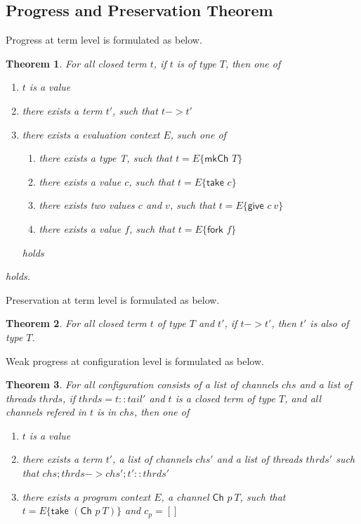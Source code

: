 \documentclass{article}
\newtheorem{theorem}{Theorem}
\newcommand{\sco}[1]{\textsf{#1}}
\newcommand{\fork}[1]{\sco{fork }#1}
\newcommand{\give}[2]{\sco{give } #1\ #2}
\newcommand{\take}[1]{\sco{take } #1}
\newcommand{\mkch}[1]{\sco{mkCh } #1}
\newcommand{\channel}[2]{\sco{Ch }#1\ #2}
\begin{document}
\subsection{Progress and Preservation Theorem}

Progress at term level is formulated as below.

\begin{theorem}
    For all closed term $t$, if $t$ is of type $T$, then one of
    \begin{enumerate}
        \item $t$ is a value
        \item there exists a term $t'$, such that $t -> t'$
        \item there exists a evaluation context $E$, such one of
                \begin{enumerate}
                    \item there exists a type T, such that $t = E\{\mkch{T}\}$
                    \item there exists a value $c$, such that $t = E\{\take{c}\}$
                    \item there exists two values $c$ and $v$, such that $t = E\{\give{c}{v}\}$
                    \item there exists a value $f$, such that $t = E\{\fork{f}\}$
                \end{enumerate}
              holds
    \end{enumerate}
    holds.
\end{theorem}

Preservation at term level is formulated as below.

\begin{theorem}
    For all closed term $t$ of type $T$ and $t'$, if $t -> t'$, then $t'$ is also of type $T$.
\end{theorem}

Weak progress at configuration level is formulated as below.

\begin{theorem}
    For all configuration consists of a list of channels $chs$ and a list of threads $thrds$,
    if $thrds = t :: tail'$ and $t$ is a closed term of type $T$, and all channels refered in $t$ is
    in $chs$, then one of
    \begin{enumerate}
        \item $t$ is a value
        \item there exists a term $t'$, a list of channels $chs'$ and a list of threads $thrds'$
                such that $chs;thrds -> chs';t' :: thrds'$
        \item there exists a program context $E$, a channel $\channel{p}{T}$, such that
                $t = E\{\take{(\channel{p}{T})}\}$ and $c_p = []$
    \end{enumerate}
\end{theorem}
\end{document}
